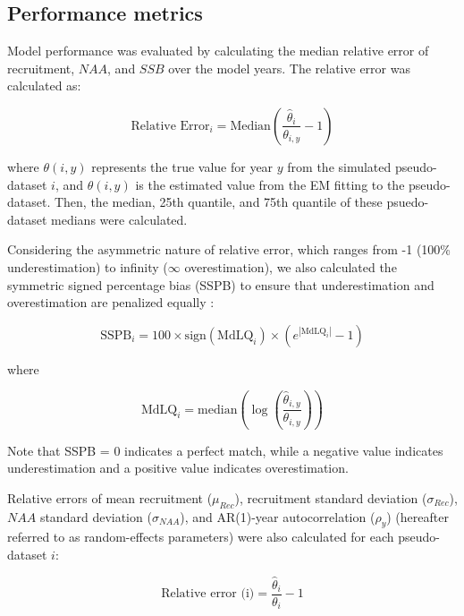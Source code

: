 \documentclass[
  12pt,
]{article}
\begin{document}
\subsection{Performance metrics}\label{performance-metrics}

Model performance was evaluated by calculating the median relative error
of recruitment, \(NAA\), and \(SSB\) over the model years. The relative
error was calculated as:

\begin{equation}
\text{Relative Error}_{i} = \text{Median} \left( \frac{\hat{\theta}_{i}}{\theta_{i,y}} - 1 \right)
\end{equation}

where \(\theta(i,y)\) represents the true value for year \(y\) from the
simulated pseudo-dataset \(i\), and \(\hat{\theta}(i,y)\) is the
estimated value from the EM fitting to the pseudo-dataset. Then, the
median, 25th quantile, and 75th quantile of these psuedo-dataset medians
were calculated.

Considering the asymmetric nature of relative error, which ranges from
-1 (100\% underestimation) to infinity (\(\infty\) overestimation), we
also calculated the symmetric signed percentage bias (SSPB) to ensure
that underestimation and overestimation are penalized equally
\citep{Morley2018}:

\begin{equation}
\text{SSPB}_{i} = 100 \times \text{sign}(\text{MdLQ}_{i}) \times \left( e^{|\text{MdLQ}_{i}|} - 1 \right)
\end{equation}

where

\begin{equation}
\text{MdLQ}_{i} = \text{median}\left( \log \left( \frac{\hat{\theta}_{i,y}}{\theta_{i,y}} \right) \right)
\end{equation}

Note that SSPB = 0 indicates a perfect match, while a negative value
indicates underestimation and a positive value indicates overestimation.

Relative errors of mean recruitment (\(\mu_{Rec}\)), recruitment
standard deviation (\(\sigma_{Rec}\)), \(NAA\) standard deviation
(\(\sigma_{NAA}\)), and AR(1)-year autocorrelation (\(\rho_{y}\))
(hereafter referred to as random-effects parameters) were also
calculated for each pseudo-dataset \(i\):

\begin{equation}
\text{Relative error (i)} = \frac{\hat{\theta}_{i}}{\theta_{i}} - 1
\end{equation}
\end{document}
